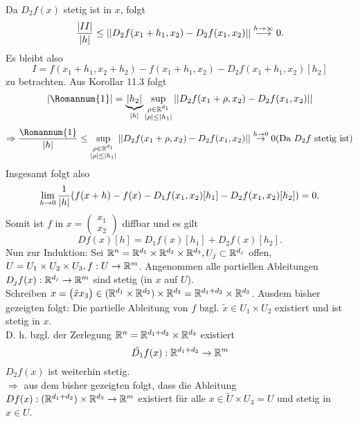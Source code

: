 \documentclass[../ana2.tex]{subfiles}
\begin{document}
\begin{bew}
\begin{align*}
    \end{align*}
    Da \( D_2f(x) \) stetig ist in \(x\), folgt 
    \[ \frac{\left|II\right|}{\left|h\right|} \leq \left|\left| D_2 f(x_1 + h_1, x_2) - D_2 f(x_1, x_2) \right|\right| 
    \overset{h\rightarrow \infty}{\longrightarrow} 0. \]
    Es bleibt also 
    \[ I = f(x_1 + h_1, x_2 + h_2) - f(x_1 + h_1, x_2) - D_2 f(x_1 + h_1, x_2)[h_2] \]
    zu betrachten.
    Aus Korollar 11.3 folgt
    \[ \abs{\Romannum{1}} = \underbrace{\abs{h_2}}_{\abs{h}} \underset{
    \substack{
        \rho \in \R^{d_1}\\
        \abs{\rho} \leq \abs{h_1}
    }}{\sup} \norm{D_2f(x_1+\rho, x_2) - D_2f(x_1, x_2)} \]
    \[ \Rightarrow \frac{\Romannum{1}}{\abs{h}} \leq \underset{
        \substack{
            \rho \in \R^{d_1}\\
            \abs{\rho} \leq \abs{h_1}
        }}{\sup} \norm{D_2f(x_1+\rho, x_2) - D_2f(x_1, x_2)}
        \overset{h \rightarrow 0}{\rightarrow} 0 
        (\text{Da } D_2f \text{ stetig ist}) \]    
    Insgesamt folgt also 
    \[ \lim\limits_{h\rightarrow{}0} \frac{1}{\left|h\right|} (f(x + h) - f(x) 
    - D_1f(x_1, x_2)[h_1] 
    - D_2 f(x_1, x_2)[h_2] ) = 0. \]
    Somit ist \(f\) in \(x = \begin{pmatrix}x_1\\x_2\end{pmatrix} \) 
    diffbar und es gilt 
    \[ Df(x)[h] = D_1 f(x)[h_1] + D_2f(x)[h_2]. \]    
    Nun zur Induktion:
    Sei \( \mathbb{R}^n = \mathbb{R}^{d_1} \times \mathbb{R}^{d_2} 
    \times \mathbb{R}^{d_3}, U_j \subset \mathbb{R}^{d_j} \) offen, 
    \( U = U_1 \times U_2 \times U_3, f:U\rightarrow \mathbb{R}^m \). 
    Angenommen alle partiellen Ableitungen 
    \( D_j f(x):\mathbb{R}^{d_j}\rightarrow \mathbb{R}^m \) 
    sind stetig (in \(x\) auf \(U\)). \\
    Schreiben \( x = \begin{pmatrix} \tilde{x} x_3 \end{pmatrix} 
    \in (\mathbb{R}^{d_1} \times \mathbb{R}^{d_2}) \times \mathbb{R}^{d_3} 
    = \mathbb{R}^{d_1 + d_2} \times \mathbb{R}^{d_3} \).        
    Ausdem bisher gezeigten folgt: Die partielle Ableitung von
    \(f\) bzgl. \(\tilde{x} \in U_1 \times U_2\) existiert und 
    ist stetig in \(x\).\\
    D. h. bzgl. der Zerlegung \( \mathbb{R}^n = \mathbb{R}^{d_1 + d_2} \times \mathbb{R}^{d_3} \) 
    existiert \[ \tilde{D_1} f(x):\mathbb{R}^{d_1 + d_2}\rightarrow \mathbb{R}^m \]
    \( D_2f(x) \) ist weiterhin stetig.\\
    \( \Rightarrow \) aus dem bisher gezeigten folgt, dass 
    die Ableitung \( Df(x):(\mathbb{R}^{d_1 + d_2}) \times \mathbb{R}^{d_3}\rightarrow \mathbb{R}^m \) 
    existiert für alle \( x\in \tilde{U} \times U_3 = U \) und stetig 
    in \( x \in U \).
\end{bew}
\end{document}
